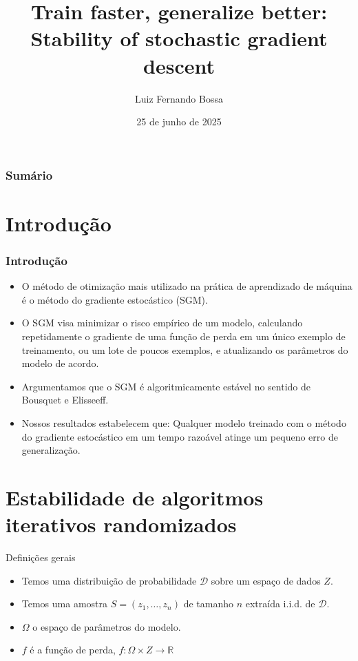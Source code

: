 \documentclass{beamer}
\title{Train faster, generalize better: Stability of stochastic gradient descent}
\author{Luiz Fernando Bossa}
\date{25 de junho de 2025}
\begin{document}
\begin{frame}
\titlepage
\end{frame}

\begin{frame}
\frametitle{Sumário}
\tableofcontents
\end{frame}

\section{Introdução}
\begin{frame}
\tableofcontents[currentsection]
\end{frame}

\begin{frame}
\frametitle{Introdução}
\begin{itemize}
    \item O método de otimização mais utilizado na prática de aprendizado de máquina é o método do gradiente estocástico (SGM). 
    \item O SGM visa minimizar o risco empírico de um modelo, calculando repetidamente o gradiente de uma função de perda em um único exemplo de treinamento, ou um lote de poucos exemplos, e atualizando os parâmetros do modelo de acordo. 
    \item Argumentamos que o SGM é algoritmicamente estável no sentido de Bousquet e Elisseeff. 
    \item Nossos resultados estabelecem que: Qualquer modelo treinado com o método do gradiente estocástico em um tempo razoável atinge um pequeno erro de generalização. 
\end{itemize}
\end{frame}

\section{Estabilidade de algoritmos iterativos randomizados}
\begin{frame}
\tableofcontents[currentsection]
\end{frame}

\begin{frame}{Definições gerais}
    \begin{itemize}
        \item Temos uma distribuição de probabilidade \(\mathcal{D}\) sobre um espaço de dados \(Z\).
        \item Temos uma amostra $S = (z_1, \ldots, z_n)$ de tamanho \(n\) extraída i.i.d. de \(\mathcal{D}\).
        \item $\Omega$ o espaço de parâmetros do modelo.
        \item $f$ é a função de perda, $f:\Omega\times Z\rightarrow\mathbb{R}$
    \end{itemize}
\end{frame}
\end{document}
